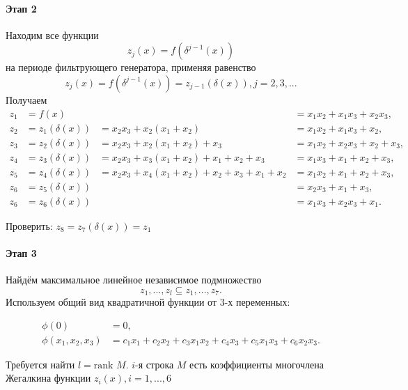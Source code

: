 \documentclass[a4paper,12pt]{article}
\newcommand{\rank}{\text{rank }}
\begin{document}
\paragraph{Этап 2}
Находим все функции \[ z_j(x) = f(\delta^{j-1}(x)) \] на периоде фильтрующего генератора, применяя равенство \[ z_j(x) = f(\delta^{j-1}(x)) = z_{j-1}(\delta(x)), j = 2,3,... \]
Получаем
$$
\begin{aligned}
z_1 &= f(x) & &= x_1x_2 + x_1x_3 + x_2x_3,\\
z_2 &= z_1(\delta(x)) &= x_2x_3 + x_2(x_1 + x_2) &= x_1x_2 + x_1x_3 + x_2,\\
z_3 &= z_2(\delta(x)) &= x_2x_3 + x_2(x_1 + x_2) + x_3 &= x_1x_2 + x_2x_3 + x_2 + x_3,\\
z_4 &= z_3(\delta(x)) &= x_2x_3 + x_3(x_1 + x_2) + x_1 + x_2 + x_3 &= x_1x_3 + x_1 + x_2 + x_3,\\
z_5 &= z_4(\delta(x)) &= x_2x_3 + x_4(x_1 + x_2) + x_2 + x_3 + x_1 + x_2 &= x_1x_2 + x_1 + x_2 + x_3,\\
z_6 &= z_5(\delta(x)) & &= x_2x_3 + x_1 + x_3,\\
z_6 &= z_6(\delta(x)) & &= x_1x_3 + x_2x_3 + x_1.
\end{aligned}
$$

Проверить: $z_8 = z_7(\delta(x)) = z_1$
\paragraph{Этап 3}
Найдём максимальное линейное независимое подмножество \[ {z_1, ..., z_l} \subseteq {z_1, ..., z_7}. \]
Используем общий вид квадратичной функции от 3-х переменных:

$$
\begin{aligned}
\phi(0) &= 0,\\
\phi(x_1, x_2, x_3) &= c_1x_1 + c_2x_2 + c_3x_1x_2 + c_4x_3 + c_5x_1x_3 + c_6x_2x_3.
\end{aligned}
$$

Требуется найти $l = \rank M$. $i$-я строка $M$ есть коэффициенты многочлена Жегалкина функции $z_i(x), i = 1, ..., 6$
\end{document}
